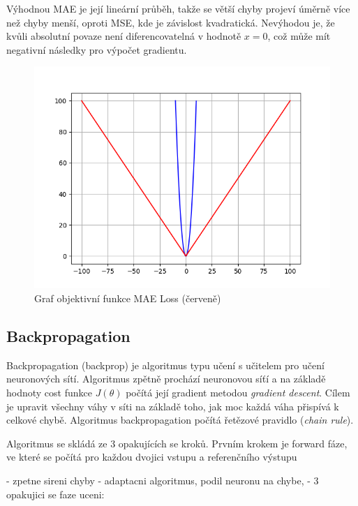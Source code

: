 Výhodnou MAE je její lineární průběh, takže se větší chyby projeví úměrně více než chyby menší, oproti MSE, kde je závislost kvadratická. Nevýhodou je, že kvůli absolutní povaze není diferencovatelná v hodnotě $x=0$, což může mít negativní následky pro výpočet gradientu.

\begin{figure}[H]
    \centering
    \includegraphics[scale=0.4]{obrazky-figures/maeloss.png}
    \caption{\label{fig:maeloss}Graf objektivní funkce MAE Loss (červeně)}
\end{figure}



\subsection{Backpropagation}
Backpropagation (backprop) je algoritmus typu učení s učitelem pro učení neuronových sítí. Algoritmus zpětně prochází neuronovou síťí a na základě hodnoty cost funkce $J(\theta)$ počítá její gradient metodou \textit{gradient descent}. Cílem je upravit všechny váhy v síti na základě toho, jak moc každá váha přispívá k celkové chybě. Algoritmus backpropagation počítá řetězové pravidlo (\textit{chain rule}).

Algoritmus se skládá ze 3 opakujících se kroků. Prvním krokem je forward fáze, ve které se počítá pro každou dvojici vstupu a referenčního výstupu 


\cite{web-brilliant}
\cite[p~197]{deeplearning}


- zpetne sireni chyby
- adaptacni algoritmus, podil neuronu na chybe,
- 3 opakujici se faze uceni:


